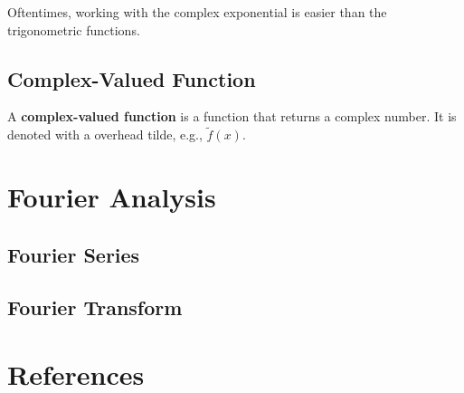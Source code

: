 \documentclass[a4paper, titlepage]{book}
\begin{document}
Oftentimes, working with the complex exponential is easier than the trigonometric functions.

\section{Complex-Valued Function}

A \textbf{complex-valued function} is a function that returns a complex number.
It is denoted with a overhead tilde, e.g., \(\tilde{f}\left(x\right)\).


\chapter{Fourier Analysis}

\section{Fourier Series}

\section{Fourier Transform}


\backmatter

\chapter{References}
\end{document}
